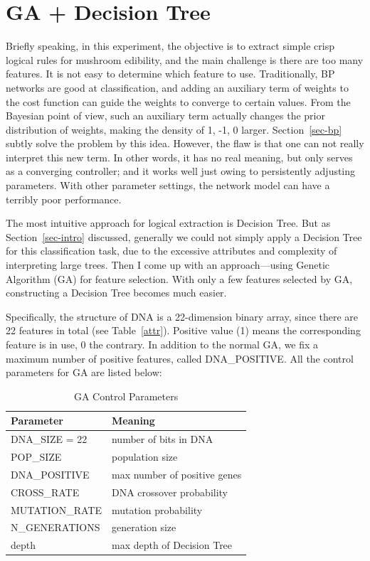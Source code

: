 \documentclass[runningheads]{llncs}
\begin{document}
\section{GA + Decision Tree}
Briefly speaking, in this experiment, the objective is to extract simple crisp logical rules for mushroom edibility, and the main challenge is there are too many features. It is not easy to determine which feature to use. Traditionally, BP networks are good at classification, and adding an auxiliary term of weights to the cost function can guide the weights to converge to certain values. From the Bayesian point of view, such an auxiliary term actually changes the prior distribution of weights, making the density of 1, -1, 0 larger. Section~\ref{sec-bp} subtly solve the problem by this idea. However, the flaw is that one can not really interpret this new term. In other words, it has no real meaning, but only serves as a converging controller; and it works well just owing to persistently adjusting parameters. With other parameter settings, the network model can have a terribly poor performance.

The most intuitive approach for logical extraction is Decision Tree. But as Section~\ref{sec-intro} discussed, generally we could not simply apply a Decision Tree for this classification task, due to the excessive attributes and complexity of interpreting large trees. Then I come up with an approach---using Genetic Algorithm (GA) for feature selection. With only a few features selected by GA, constructing a Decision Tree becomes much easier.

Specifically, the structure of DNA is a 22-dimension binary array, since there are 22 features in total (see Table~\ref{attr}). Positive value (1) means the corresponding feature is in use, 0 the contrary. In addition to the normal GA, we fix a maximum number of positive features, called DNA\_POSITIVE. All the control parameters for GA are listed below:

\begin{table}
	\caption{GA Control Parameters}
	\label{tab-GA}
	\centering
	\begin{tabular}{l@{\qquad\qquad}l}
		\toprule
		Parameter & Meaning \\
		\midrule
		DNA\_SIZE = 22 & number of bits in DNA \\
		POP\_SIZE & population size \\
		DNA\_POSITIVE & max number of positive genes \\
		CROSS\_RATE & DNA crossover probability \\
		MUTATION\_RATE & mutation probability \\
		N\_GENERATIONS & generation size \\
		depth & max depth of Decision Tree \\
		\bottomrule
	\end{tabular}
\end{table}
\end{document}
